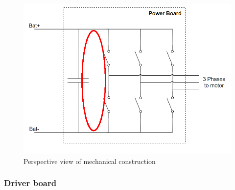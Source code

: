 \begin{figure}[H]
	\centering
	\includegraphics[width=1\textwidth]{pictures/hardware/Power_Board/Sketch_of_powerBoard_circulating.PNG}
	\caption{Perspective view of mechanical construction}
	\label{fig:cap_circ}
\end{figure}

\subsubsection{Driver board}


